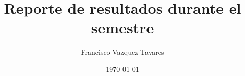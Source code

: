 \documentclass[a4paper]{tufte-handout} %
\title{ Reporte de resultados durante el semestre }
\author{Francisco Vazquez-Tavares}
\date{\today} %
\begin{document}
\maketitle %


\begin{abstract}
\end{abstract}



\end{document}
